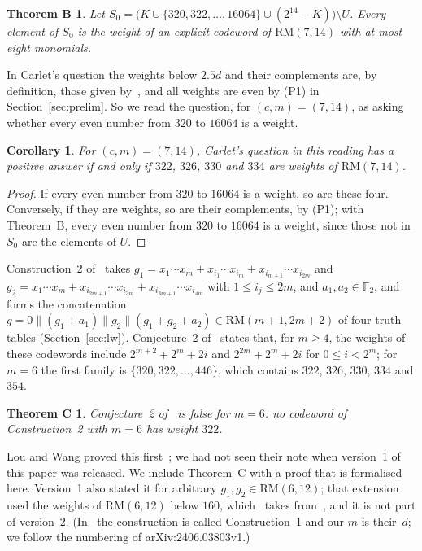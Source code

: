 \documentclass[11pt]{article}
\newtheorem*{thmB}{Theorem B}
\newtheorem*{thmC}{Theorem C}
\newtheorem*{corollary}{Corollary}
\theoremstyle{remark}
\newcommand{\F}{\mathbb F}
\newcommand{\RM}{\mathrm{RM}}
\newcommand{\cat}{\mathbin{\|}}
\begin{document}
\begin{thmB}
Let $S_0=\bigl(K\cup\{320,322,\dots,16064\}\cup(2^{14}-K)\bigr)\setminus U$.
Every element of $S_0$ is the weight of an explicit codeword of $\RM(7,14)$ with
at most eight monomials.
\end{thmB}

In Carlet's question the weights below $2.5d$ and their complements are, by
definition, those given by~\cite{kt,kta}, and all weights are even by (P1)
in Section~\ref{sec:prelim}. So we read the question, for $(c,m)=(7,14)$, as
asking whether every even number from $320$ to $16064$ is a weight.

\begin{corollary}
For $(c,m)=(7,14)$, Carlet's question in this reading has a positive answer if
and only if $322$, $326$, $330$ and $334$ are weights of $\RM(7,14)$.
\end{corollary}
\begin{proof}
If every even number from $320$ to $16064$ is a weight, so are these four.
Conversely, if they are weights, so are their complements, by (P1); with
Theorem~B, every even number from $320$ to $16064$ is a weight, since those
not in $S_0$ are the elements of $U$.
\end{proof}

Construction~2 of~\cite{lw} takes
$g_1=x_1\cdots x_m+x_{i_1}\cdots x_{i_m}+x_{i_{m+1}}\cdots x_{i_{2m}}$ and
$g_2=x_1\cdots x_m+x_{i_{2m+1}}\cdots x_{i_{3m}}+x_{i_{3m+1}}\cdots x_{i_{4m}}$
with $1\le i_j\le2m$, and $a_1,a_2\in\F_2$, and forms the concatenation
$g=0\cat(g_1+a_1)\cat g_2\cat(g_1+g_2+a_2)\in\RM(m+1,2m+2)$ of four truth
tables (Section~\ref{sec:lw}). Conjecture~2 of~\cite{lw} states that, for
$m\ge4$, the weights of these codewords include $2^{m+2}+2^m+2i$ and
$2^{2m}+2^m+2i$ for $0\le i<2^m$; for $m=6$ the first family is
$\{320,322,\dots,446\}$, which contains $322$, $326$, $330$, $334$ and $354$.

\begin{thmC}
Conjecture~2 of~\cite{lw} is false for $m=6$: no codeword of Construction~2
with $m=6$ has weight $322$.
\end{thmC}

Lou and Wang proved this first~\cite[Proposition~2]{lw2}; we had not seen their
note when version~1 of this paper was released. We include Theorem~C with a
proof that is formalised here. Version~1 also stated it for arbitrary
$g_1,g_2\in\RM(6,12)$; that extension used the weights of $\RM(6,12)$ below
$160$, which~\cite[Lemma~2]{lw} takes from~\cite{kt,kta}, and it is not part of
version~2. (In~\cite{lw2} the construction is called Construction~1 and our
$m$ is their~$d$; we follow the numbering of arXiv:2406.03803v1.)
\end{document}
